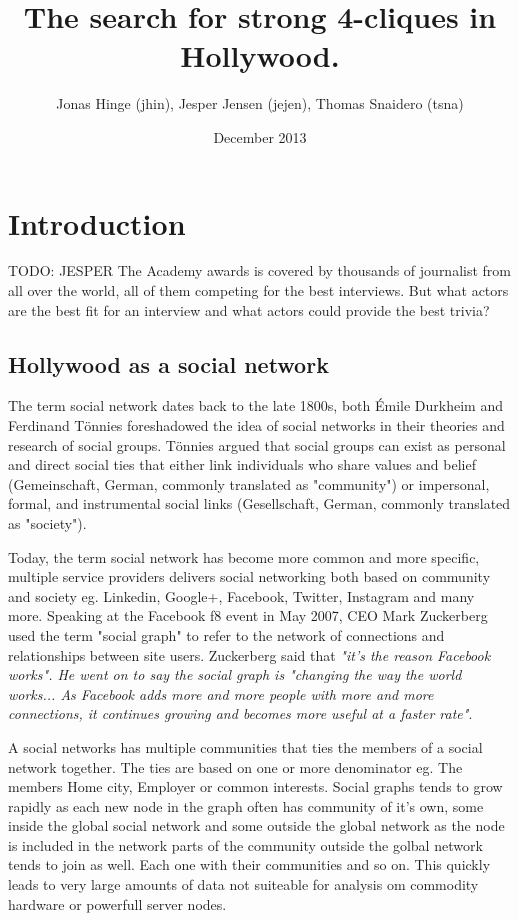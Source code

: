 \documentclass{article}
\title{The search for strong 4-cliques in Hollywood.}
\author{Jonas Hinge (jhin), Jesper Jensen (jejen),  Thomas Snaidero (tsna)}
\date{December 2013}
\begin{document}
\maketitle

\section{Introduction}
TODO: JESPER
The Academy awards is covered by thousands of journalist from all over the world, all of them competing for the best interviews. But what actors are the best fit for an interview and what actors could provide the best trivia?

\subsection{Hollywood as a social network}
The term social network dates back to the late 1800s, both Émile Durkheim and Ferdinand Tönnies foreshadowed the idea of social networks in their theories and research of social groups. Tönnies argued that social groups can exist as personal and direct social ties that either link individuals who share values and belief (Gemeinschaft, German, commonly translated as "community") or impersonal, formal, and instrumental social links (Gesellschaft, German, commonly translated as "society").

\noindent Today, the term social network has become more common and more specific, multiple service providers delivers social networking both based on community and society eg. Linkedin, Google+, Facebook, Twitter, Instagram and many more. Speaking at the Facebook f8 event in May 2007, CEO Mark Zuckerberg used the term "social graph" to refer to the network of connections and relationships between site users. Zuckerberg said that \textit{ "it's the reason Facebook works". He went on to say the social graph is "changing the way the world works... As Facebook adds more and more people with more and more connections, it continues growing and becomes more useful at a faster rate"}. \cite{socialgraphwiki}

\noindent A social networks has multiple communities that ties the members of a social network together. The ties are based on one or more denominator eg. The members Home city, Employer or common interests. Social graphs tends to grow rapidly as each new node in the graph often has community of it's own, some inside the global social network and some outside the global network as the node is included in the network parts of the community outside the golbal network tends to join as well. Each one with their communities and so on. This quickly leads to very large amounts of data not suiteable for analysis om commodity hardware or powerfull server nodes.
\end{document}
